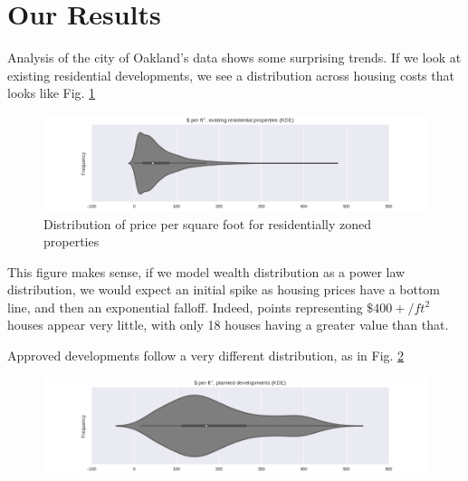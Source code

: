 \documentclass[]{report}
\begin{document}
	\section{Our Results}
	Analysis of the city of Oakland's data shows some surprising trends. If we look at existing residential developments, we see a distribution across housing costs that looks like Fig. \ref{fig:residential-kde}
	\begin{figure}[H]
		\centering
		\includegraphics[width=\linewidth]{"img/residential KDE"}
		\caption{Distribution of price per square foot for residentially zoned properties}
		\label{fig:residential-kde}
	\end{figure}
	This figure makes sense, if we model wealth distribution as a power law distribution, we would expect an initial spike as housing prices have a bottom line, and then an exponential falloff. Indeed, points representing $\$400+/ft^2$ houses appear very little, with only 18 houses having a greater value than that.
	
	
	Approved developments follow a very different distribution, as in Fig. \ref{fig:planned-kde}
	
	\begin{figure}[H]
		\centering
		\includegraphics[width=\linewidth]{"img/planned KDE"}
		\caption{}
		\label{fig:planned-kde}
	\end{figure}
	
\end{document}
